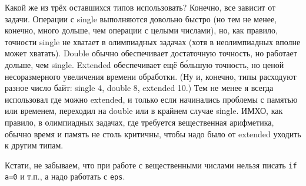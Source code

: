 Какой же из трёх оставшихся типов использовать? Конечно, все зависит от задачи. Операции с single 
выполняются довольно быстро (но тем не менее, конечно, много дольше, чем операции с целыми 
числами), но, как правило, точности single не хватает в олимпиадных задачах (хотя в неолимпиадных 
вполне может хватать). Double обычно 
обеспечивает достаточную точность, но работает дольше, чем single. Extended обеспечивает ещё 
б\'{о}льшую точность, но ценой несоразмерного увеличения времени обработки. (Ну и, конечно, типы 
расходуют разное число байт: single 4, double 8, extended 10.) Тем не менее я всегда 
использовал где можно extended, и только если начинались проблемы с памятью или временем, переходил 
на double или в крайнем случае single. ИМХО, как правило, в олимпиадных задачах, где требуется 
вещественная арифметика, обычно время и память не столь критичны, чтобы надо было от extended 
уходить к другим типам.

Кстати, не забываем, что при работе с вещественными числами нельзя писать \verb|if a=0| и т.п., а надо работать с \verb|eps|.

